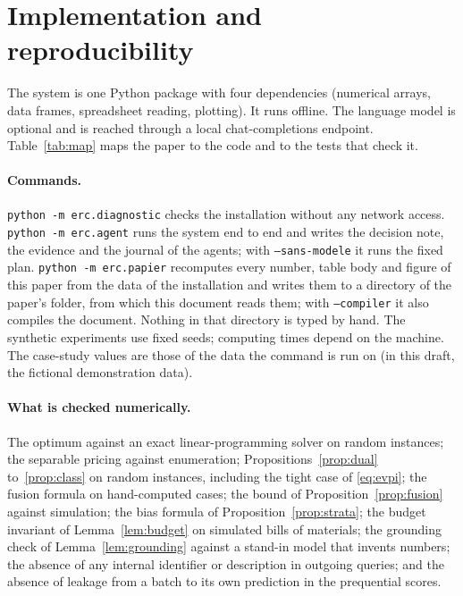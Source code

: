 \section{Implementation and reproducibility}\label{app:repro}

The system is one Python package with four dependencies (numerical arrays, data frames, spreadsheet reading,
plotting). It runs offline. The language model is optional and is reached through a local chat-completions
endpoint. Table~\ref{tab:map} maps the paper to the code and to the tests that check it.

\paragraph{Commands.} \texttt{python -m erc.diagnostic} checks the installation without any network access.
\texttt{python -m erc.agent} runs the system end to end and writes the decision note, the evidence and the journal
of the agents; with \texttt{--sans-modele} it runs the fixed plan. \texttt{python -m erc.papier} recomputes every
number, table body and figure of this paper from the data of the installation and writes them to a directory of
the paper's folder, from which this document reads them; with \texttt{--compiler} it also compiles the document.
Nothing in that directory is typed by hand. The synthetic experiments use fixed seeds; computing times
depend on the machine. The case-study values are those of the data the command is run on
\ifnum{}\relax (in this draft, the fictional demonstration data)\fi.

\paragraph{What is checked numerically.} The optimum against an exact linear-programming solver on random
instances; the separable pricing against enumeration; Propositions~\ref{prop:dual} to~\ref{prop:class} on random
instances, including the tight case of \eqref{eq:evpi}; the fusion formula on hand-computed cases; the bound of
Proposition~\ref{prop:fusion} against simulation; the bias formula of Proposition~\ref{prop:strata}; the budget
invariant of Lemma~\ref{lem:budget} on simulated bills of materials; the grounding check of
Lemma~\ref{lem:grounding} against a stand-in model that invents numbers; the absence of any internal identifier or
description in outgoing queries; and the absence of leakage from a batch to its own prediction in the prequential
scores.

